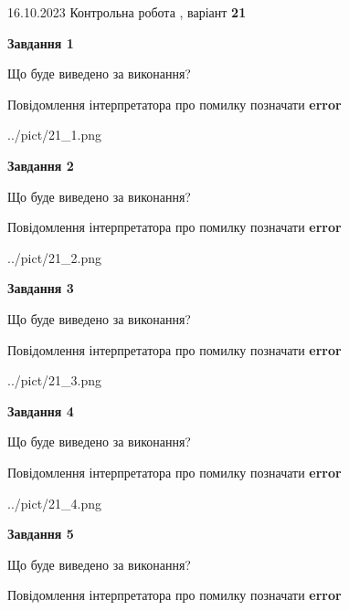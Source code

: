 \documentclass[12pt, ukrainian]{article}
\begin{document}
{\Large{16.10.2023 Контрольна робота , варіант  \No \textbf { 21 }\par}}
{
\begin {large}
{\begin {center}\textbf{Завдання 1}\end {center}}\par
Що буде виведено за виконання? \par
Повідомлення інтерпретатора про помилку позначати \textbf{error}

\begin{center}
	{../pict/21_1.png}
\end{center}
\newpage

{\begin {center}\textbf{Завдання 2}\end {center}}\par
Що буде виведено за виконання? \par
Повідомлення інтерпретатора про помилку позначати \textbf{error}

\begin{center}
	{../pict/21_2.png}
\end{center}
\newpage

{\begin {center}\textbf{Завдання 3}\end {center}}\par
Що буде виведено за виконання? \par
Повідомлення інтерпретатора про помилку позначати \textbf{error}

\begin{center}
	{../pict/21_3.png}
\end{center}
\newpage

{\begin {center}\textbf{Завдання 4}\end {center}}\par
Що буде виведено за виконання? \par
Повідомлення інтерпретатора про помилку позначати \textbf{error}

\begin{center}
	{../pict/21_4.png}
\end{center}
\newpage

{\begin {center}\textbf{Завдання 5}\end {center}}\par
Що буде виведено за виконання? \par
Повідомлення інтерпретатора про помилку позначати \textbf{error}


\end{large}}
\end{document}
